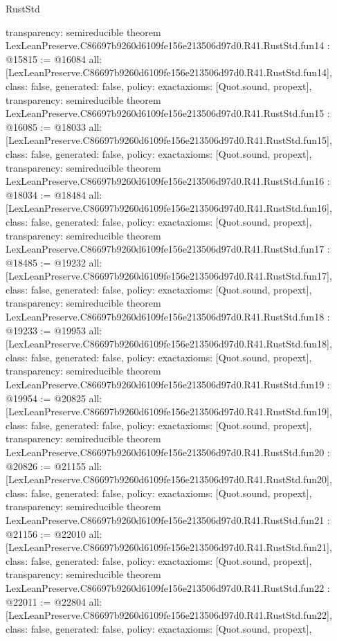\begin{lexlean}{RustStd}
\begin{coremodule}
{  transparency: semireducible
}
theorem LexLeanPreserve.C86697b9260d6109fe156e213506d97d0.R41.RustStd.fun14 : @15815 := @16084 {
  all: [LexLeanPreserve.C86697b9260d6109fe156e213506d97d0.R41.RustStd.fun14],
  class: false,
  generated: false,
  policy: exact{axioms: [Quot.sound, propext]},
  transparency: semireducible
}
theorem LexLeanPreserve.C86697b9260d6109fe156e213506d97d0.R41.RustStd.fun15 : @16085 := @18033 {
  all: [LexLeanPreserve.C86697b9260d6109fe156e213506d97d0.R41.RustStd.fun15],
  class: false,
  generated: false,
  policy: exact{axioms: [Quot.sound, propext]},
  transparency: semireducible
}
theorem LexLeanPreserve.C86697b9260d6109fe156e213506d97d0.R41.RustStd.fun16 : @18034 := @18484 {
  all: [LexLeanPreserve.C86697b9260d6109fe156e213506d97d0.R41.RustStd.fun16],
  class: false,
  generated: false,
  policy: exact{axioms: [Quot.sound, propext]},
  transparency: semireducible
}
theorem LexLeanPreserve.C86697b9260d6109fe156e213506d97d0.R41.RustStd.fun17 : @18485 := @19232 {
  all: [LexLeanPreserve.C86697b9260d6109fe156e213506d97d0.R41.RustStd.fun17],
  class: false,
  generated: false,
  policy: exact{axioms: [Quot.sound, propext]},
  transparency: semireducible
}
theorem LexLeanPreserve.C86697b9260d6109fe156e213506d97d0.R41.RustStd.fun18 : @19233 := @19953 {
  all: [LexLeanPreserve.C86697b9260d6109fe156e213506d97d0.R41.RustStd.fun18],
  class: false,
  generated: false,
  policy: exact{axioms: [Quot.sound, propext]},
  transparency: semireducible
}
theorem LexLeanPreserve.C86697b9260d6109fe156e213506d97d0.R41.RustStd.fun19 : @19954 := @20825 {
  all: [LexLeanPreserve.C86697b9260d6109fe156e213506d97d0.R41.RustStd.fun19],
  class: false,
  generated: false,
  policy: exact{axioms: [Quot.sound, propext]},
  transparency: semireducible
}
theorem LexLeanPreserve.C86697b9260d6109fe156e213506d97d0.R41.RustStd.fun20 : @20826 := @21155 {
  all: [LexLeanPreserve.C86697b9260d6109fe156e213506d97d0.R41.RustStd.fun20],
  class: false,
  generated: false,
  policy: exact{axioms: [Quot.sound, propext]},
  transparency: semireducible
}
theorem LexLeanPreserve.C86697b9260d6109fe156e213506d97d0.R41.RustStd.fun21 : @21156 := @22010 {
  all: [LexLeanPreserve.C86697b9260d6109fe156e213506d97d0.R41.RustStd.fun21],
  class: false,
  generated: false,
  policy: exact{axioms: [Quot.sound, propext]},
  transparency: semireducible
}
theorem LexLeanPreserve.C86697b9260d6109fe156e213506d97d0.R41.RustStd.fun22 : @22011 := @22804 {
  all: [LexLeanPreserve.C86697b9260d6109fe156e213506d97d0.R41.RustStd.fun22],
  class: false,
  generated: false,
  policy: exact{axioms: [Quot.sound, propext]},
}
\end{coremodule}
\end{lexlean}
